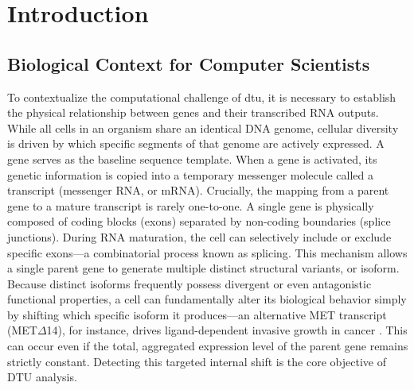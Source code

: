 \chapter{Introduction}

\section{Biological Context for Computer Scientists}
To contextualize the computational challenge of \gls{dtu}, it is necessary to establish the physical relationship between genes and their transcribed RNA outputs. While all cells in an organism share an identical DNA genome, cellular diversity is driven by which specific segments of that genome are actively expressed. A gene serves as the baseline sequence template. When a gene is activated, its genetic information is copied into a temporary messenger molecule called a transcript (messenger RNA, or mRNA). Crucially, the mapping from a parent gene to a mature transcript is rarely one-to-one. A single gene is physically composed of coding blocks (exons) separated by non-coding boundaries (splice junctions). During RNA maturation, the cell can selectively include or exclude specific exons---a combinatorial process known as \gls{splicing}. This mechanism allows a single parent gene to generate multiple distinct structural variants, or \gls{isoform}. Because distinct isoforms frequently possess divergent or even antagonistic functional properties, a cell can fundamentally alter its biological behavior simply by shifting which specific isoform it produces---an alternative MET transcript (MET$\Delta$14), for instance, drives ligand-dependent invasive growth in cancer \cite{cerqua2022met}. This can occur even if the total, aggregated expression level of the parent gene remains strictly constant. Detecting this targeted internal shift is the core objective of DTU analysis.

